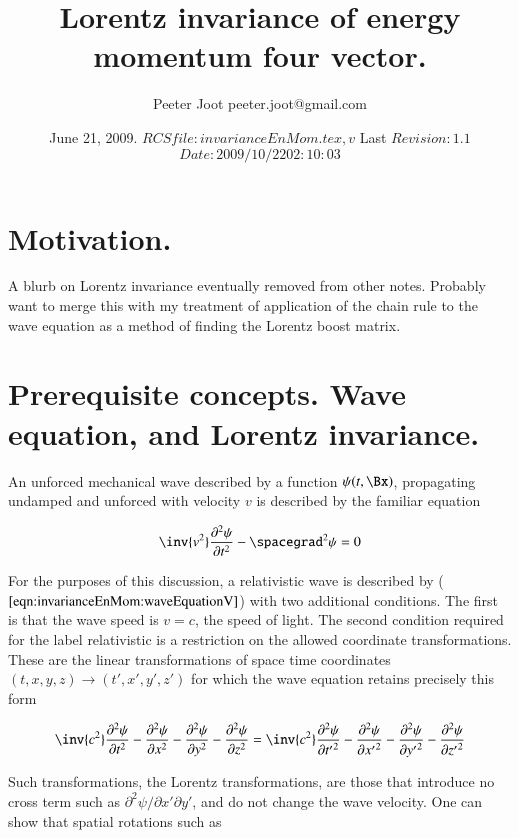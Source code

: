 \documentclass{article}
\title{Lorentz invariance of energy momentum four vector.}
\author{Peeter Joot \quad peeter.joot@gmail.com }
\date{ June 21, 2009.  $RCSfile: invarianceEnMom.tex,v $ Last $Revision: 1.1 $ $Date: 2009/10/22 02:10:03 $ }
\begin{document}
\maketitle{}
\tableofcontents
\section{Motivation.}

A blurb on Lorentz invariance eventually removed from other notes.
Probably want to merge this with my treatment of application of the
chain rule to the wave equation as a method of
finding the Lorentz boost matrix.

\section{Prerequisite concepts.  Wave equation, and Lorentz invariance.}

An unforced mechanical wave described by a function $\psi(t,\Bx)$, propagating undamped and unforced with
velocity $v$ is described by the familiar equation

\begin{align}\label{eqn:invarianceEnMom:waveEquationV}
\inv{v^2} \frac{\partial^2 \psi}{\partial t^2} - \spacegrad^2 \psi = 0
\end{align}

For the purposes of this discussion, a relativistic wave is described by ($\ref{eqn:invarianceEnMom:waveEquationV}$) with two
additional conditions.  The first is that the wave speed is
$v = c$, the speed of light.  The second condition required for the label relativistic 
is a restriction on the allowed coordinate transformations.  These are the linear transformations
of space time coordinates
$(t,x,y,z) \rightarrow (t', x', y', z')$ for which the wave equation retains precisely this form

\begin{align}\label{eqn:invarianceEnMom:waveEquationInv}
\inv{c^2} \frac{\partial^2 \psi}{\partial {t}^2} 
- \frac{\partial^2 \psi}{\partial {x}^2} 
- \frac{\partial^2 \psi}{\partial {y}^2} 
- \frac{\partial^2 \psi}{\partial {z}^2} 
=
\inv{c^2} \frac{\partial^2 \psi}{\partial {t'}^2} 
- \frac{\partial^2 \psi}{\partial {x'}^2} 
- \frac{\partial^2 \psi}{\partial {y'}^2} 
- \frac{\partial^2 \psi}{\partial {z'}^2} 
\end{align}

Such transformations, the Lorentz transformations,
are those that introduce no cross term such as $\partial^2 \psi/\partial x' \partial y'$,
and do not change the wave velocity.  One can show that spatial rotations such as
\end{document}
